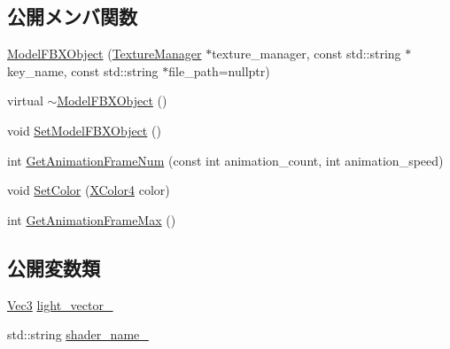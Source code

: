 \subsection*{公開メンバ関数}
\begin{DoxyCompactItemize}
\item 
\mbox{\hyperlink{class_model_f_b_x_object_a45586ead07b17f4a90ba320c41d7f1c3}{Model\+F\+B\+X\+Object}} (\mbox{\hyperlink{class_texture_manager}{Texture\+Manager}} $\ast$texture\+\_\+manager, const std\+::string $\ast$key\+\_\+name, const std\+::string $\ast$file\+\_\+path=nullptr)
\item 
virtual \mbox{\hyperlink{class_model_f_b_x_object_a3fa838235e50d797539d6b266f8e2c96}{$\sim$\+Model\+F\+B\+X\+Object}} ()
\item 
void \mbox{\hyperlink{class_model_f_b_x_object_a3c101cf65da1bdb55b7a11e71cefcad0}{Set\+Model\+F\+B\+X\+Object}} ()
\item 
int \mbox{\hyperlink{class_model_f_b_x_object_a87516b4e5aa6341188e47f956d4a180f}{Get\+Animation\+Frame\+Num}} (const int animation\+\_\+count, int animation\+\_\+speed)
\item 
void \mbox{\hyperlink{class_model_f_b_x_object_acbe9d90631a3ac39b9cf65097c39aaa9}{Set\+Color}} (\mbox{\hyperlink{_vector3_d_8h_a680c30c4a07d86fe763c7e01169cd6cc}{X\+Color4}} color)
\item 
int \mbox{\hyperlink{class_model_f_b_x_object_abbeaa886c4f8f6c0d1608d58cc013226}{Get\+Animation\+Frame\+Max}} ()
\end{DoxyCompactItemize}
\subsection*{公開変数類}
\begin{DoxyCompactItemize}
\item 
\mbox{\hyperlink{_vector3_d_8h_ab16f59e4393f29a01ec8b9bbbabbe65d}{Vec3}} \mbox{\hyperlink{class_model_f_b_x_object_a9d7b849ac816b7e5841d54a4b75216a9}{light\+\_\+vector\+\_\+}}
\item 
std\+::string \mbox{\hyperlink{class_model_f_b_x_object_a9a1728e6b2d5f1a49b26c1aaf75049f0}{shader\+\_\+name\+\_\+}}
\end{DoxyCompactItemize}
